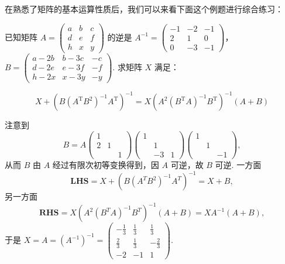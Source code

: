 在熟悉了矩阵的基本运算性质后，我们可以来看下面这个例题进行综合练习：
\begin{example}{}{}
    已知矩阵 $A=\begin{pmatrix}a & b & c \\ d & e & f \\ h & x & y\end{pmatrix}$ 的逆是 $A^{-1}=\begin{pmatrix}-1 & -2 & -1 \\ 2 & 1 & 0 \\ 0 & -3 & -1\end{pmatrix}$，\\
    $B=\begin{pmatrix}a-2b & b-3c & -c \\ d-2e & e-3f & -f \\ h-2x & x-3y & -y\end{pmatrix}$. 求矩阵 $X$ 满足：

    \[X+\left(B(A^\mathrm{T}B^2)^{-1}A^\mathrm{T}\right)^{-1}=X\left(A^2(B^\mathrm{T}A)^{-1}B^\mathrm{T}\right)^{-1}(A+B)\]
\end{example}

\begin{solution}
    注意到
    \[B=A\begin{pmatrix}
            1 &  & \\ 2 & 1 & \\ & & 1
        \end{pmatrix} \begin{pmatrix}
            1 &  & \\ & 1 & \\ & -3 & 1
        \end{pmatrix} \begin{pmatrix}
            1 &  & \\ & 1 & \\ & & -1
        \end{pmatrix},\]
    从而 $B$ 由 $A$ 经过有限次初等变换得到，因 $A$ 可逆，故 $B$ 可逆. 一方面
    \[\textbf{LHS}=X+\left(B\left(A^{T} B^{2}\right)^{-1} A^{T}\right)^{-1}=X+B,\]
    另一方面
    \[\textbf{RHS}=X\left(A^{2}\left(B^{T} A\right)^{-1} B^{T}\right)^{-1}(A+B)=X A^{-1}(A+B),\]
    于是 $X=A=(A^{-1})^{-1}=\begin{pmatrix}
            -\frac{1}{3} & \frac{1}{3} & \frac{1}{3}  \\
            \frac{2}{3}  & \frac{1}{3} & -\frac{2}{3} \\
            -2           & -1          & 1
        \end{pmatrix}$.
\end{solution}

